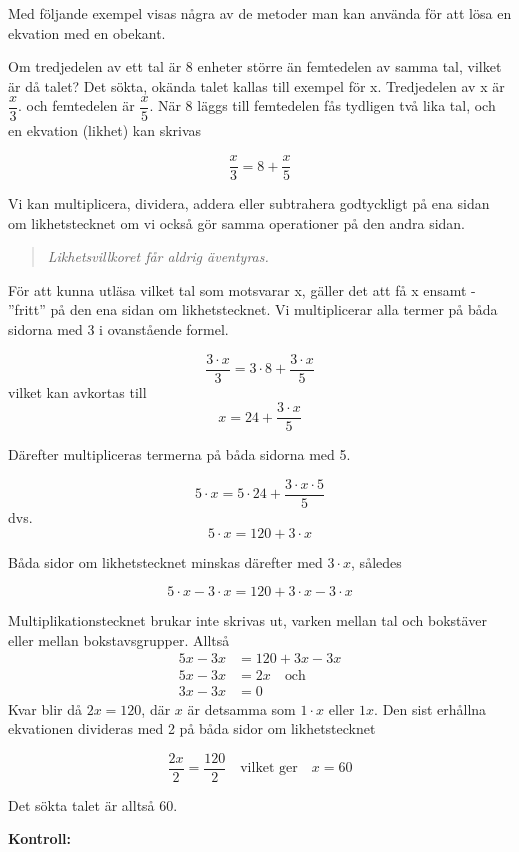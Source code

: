 Med följande exempel visas några av de metoder man kan använda för att lösa en
ekvation med en obekant.

Om tredjedelen av ett tal är 8 enheter större än femtedelen av samma tal, vilket
är då talet?
Det sökta, okända talet kallas till exempel för x.
Tredjedelen av x är \(\dfrac{x}{3}\). och femtedelen är \(\dfrac{x}{5}\).
När 8 läggs till femtedelen fås tydligen två lika tal, och en ekvation (likhet)
kan skrivas

\[\dfrac{x}{3}=8 + \dfrac{x}{5}\]

Vi kan multiplicera, dividera, addera eller subtrahera godtyckligt på ena sidan
om likhetstecknet om vi också gör samma operationer på den andra sidan.

\begin{quote}\emph{
Likhetsvillkoret får aldrig äventyras.
}\end{quote}

För att kunna utläsa vilket tal som motsvarar x, gäller det att få x ensamt -
''fritt'' på den ena sidan om likhetstecknet.
Vi multiplicerar alla termer på båda sidorna med 3 i ovanstående formel.

\[\frac{3 \cdot x}{3} = 3 \cdot 8 + \frac{3 \cdot x}{5}\]
vilket kan avkortas till
\[x = 24 + \frac{3 \cdot x}{5}\]

Därefter multipliceras termerna på båda sidorna med 5.

\[5 \cdot x = 5 \cdot 24 + \frac{3 \cdot x \cdot 5}{5}\]
dvs.
\[5 \cdot x = 120 + 3 \cdot x\]

Båda sidor om likhetstecknet minskas därefter med \(3 \cdot x\), således

\[5 \cdot x - 3 \cdot x = 120 + 3 \cdot x - 3 \cdot x\]

Multiplikationstecknet brukar inte skrivas ut, varken mellan tal och bokstäver
eller mellan bokstavsgrupper.
Alltså
\begin{align*}
5x - 3x &= 120 + 3x - 3x \\
5x - 3x &= 2x \quad \text{och} \\
3x - 3x &= 0
\end{align*}
Kvar blir då \(2x = 120\), där \(x\) är detsamma som \(1 \cdot x\) eller \(1x\).
Den sist erhållna ekvationen divideras med 2 på båda sidor om likhetstecknet

\[
\frac{2x}{2} = \frac{120}{2}
\quad \text{vilket ger} \quad
x = 60
\]

Det sökta talet är alltså 60.

\textbf{Kontroll:}

